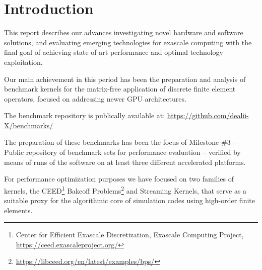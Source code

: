 \documentclass[a4paper,12pt]{article}
\newcommand{\mycomment}[1]{}
\begin{document}
\vspace*{2cm}

\disclaimer

\newpage

\tableofcontents %

\newpage

\section{{Introduction}}

\mycomment{
    \begin{itemize}
        \item Investigate novel hardware and software solutions to leverage the latest advancements in high-performance computing
    to achieve optimal performance
        \item Identify and evaluate emerging technologies that can be exploited to enhance the capabilities of the exascale computing
    system.
        \item Explore and implement techniques to optimize energy consumption and power efficiency in the exascale computing
    infrastructure.
        \item Identify and address bottlenecks in the system to improve overall computational efficiency.
    \end{itemize}
}

This report describes our advances investigating novel hardware and software solutions, and evaluating emerging technologies for exascale computing with the final goal of achieving state of art performance and optimal technology exploitation.

Our main achievement in this period has been the preparation and analysis of benchmark kernels for the matrix-free application of discrete finite element operators, focused on addressing newer GPU architectures. 

The benchmark repository is publically available at: \url{https://github.com/dealii-X/benchmarks/}

The preparation of these benchmarks has been the focus of Milestone \#3 -- Public repository of benchmark sets for performance evaluation -- verified by means of runs of the software on at
least three different accelerated platforms.

For performance optimization purposes we have focused on two families of kernels, the CEED\footnote{Center for Efficient Exascale Discretization, Exascale Computing Project, \url{https://ceed.exascaleproject.org/}} Bakeoff Problems\footnote{\url{https://libceed.org/en/latest/examples/bps/}} and Streaming Kernels, that serve as a suitable proxy for the algorithmic core of simulation codes using high-order finite elements.
\end{document}
